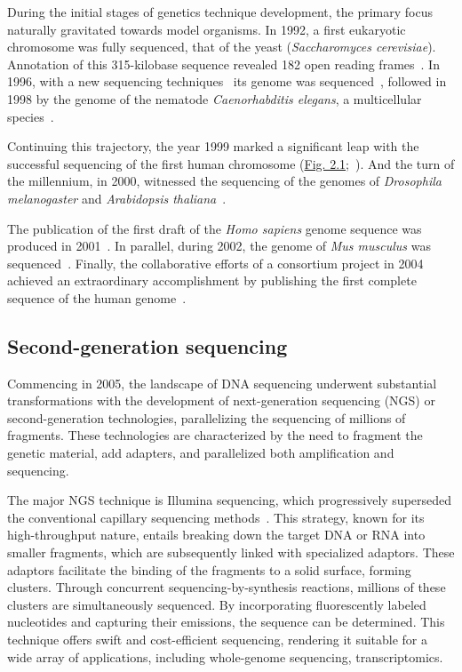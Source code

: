 During the initial stages of genetics technique development, the primary focus naturally gravitated towards model organisms. In 1992, a first eukaryotic chromosome was fully sequenced, that of the yeast (\textit{Saccharomyces cerevisiae}). Annotation of this 315-kilobase sequence revealed 182 open reading frames~\citep{oliver_complete_1992}. In 1996, with a new sequencing techniques~\citep{roach_pairwise_1995} its genome was sequenced~\citep{goffeau_life_1996}, followed in 1998 by the genome of the nematode \textit{Caenorhabditis elegans}, a multicellular species~\citep{the_c_elegans_sequencing_consortium_genome_1998}.

Continuing this trajectory, the year 1999 marked a significant leap with the successful sequencing of the first human chromosome (\hyperref[fig:chronology_bioevol]{Fig. 2.1};~\citet{dunham_dna_1999}). And the turn of the millennium, in 2000, witnessed the sequencing of the genomes of \textit{Drosophila melanogaster} and \textit{Arabidopsis thaliana}~\citep{adams_genome_2000, the_arabidopsis_genome_initiative_analysis_2000}.

The publication of the first draft of the \textit{Homo sapiens} genome sequence was produced in 2001~\citep{lander_initial_2001, venter_sequence_2001}. In parallel, during 2002, the genome of \textit{Mus musculus} was sequenced~\citep{waterston_initial_2002}. Finally, the collaborative efforts of a consortium project in 2004 achieved an extraordinary accomplishment by publishing the first complete sequence of the human genome~\citep{international_human_genome_sequencing_consortium_finishing_2004}.


\subsection{Second-generation sequencing}

Commencing in 2005, the landscape of \acrshort{DNA} sequencing underwent substantial transformations with the development of next-generation sequencing (NGS) or second-generation technologies, parallelizing the sequencing of millions of fragments. These technologies are characterized by the need to fragment the genetic material, add adapters, and parallelized both amplification and sequencing.

The major NGS technique is Illumina sequencing, which progressively superseded the conventional capillary sequencing methods~\citep{behjati_what_2013, slatko_overview_2018}. This strategy, known for its high-throughput nature, entails breaking down the target \acrshort{DNA} or \acrshort{RNA} into smaller fragments, which are subsequently linked with specialized adaptors. These adaptors facilitate the binding of the fragments to a solid surface, forming clusters. Through concurrent sequencing-by-synthesis reactions, millions of these clusters are simultaneously sequenced. By incorporating fluorescently labeled nucleotides and capturing their emissions, the sequence can be determined. This technique offers swift and cost-efficient sequencing, rendering it suitable for a wide array of applications, including whole-genome sequencing, transcriptomics. 


